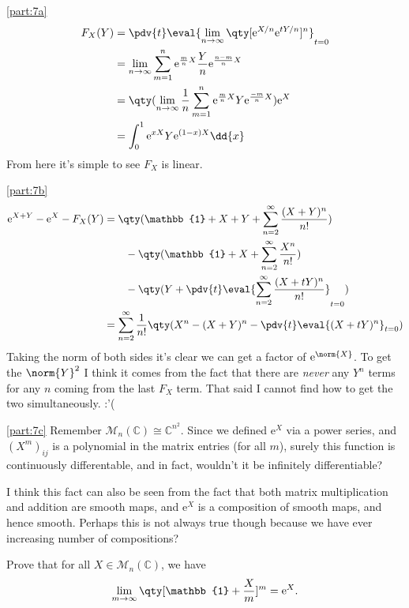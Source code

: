\documentclass[pages,boxes,color=WildStrawberry]{homework}
\newcommand{\C}{\mathbb{C}}
\newcommand{\1}{\mathbb{1}}
\newcommand{\e}{\mathrm{e}}
\newcommand{\mats}[2]{\mathcal{M}_{#1}(#2)}
\begin{document}
\begin{solution}
	\ref{part:7a}
	\begin{align*}
		F_X(Y) & = \pdv{t}\eval{\lim_{n\to\infty}\qty[\e^{X/n}\e^{tY/n}]^n}_{t=0}                                 \\
		       & = \lim_{n\to\infty}\sum_{m = 1}^{n}\e^{\frac{m}{n}X}\frac{Y}{n}\e^{\frac{n - m}{n}X}             \\
		       & = \qty(\lim_{n\to\infty}\frac{1}{n}\sum_{m = 1}^{n}\e^{\frac{m}{n}X} Y \e^{\frac{-m}{n}X})\e^{X} \\
		       & = \int_0^1\e^{xX}Y\e^{(1-x)X}\dd{x}
	\end{align*}
	From here it's simple to see $F_X$ is linear.

	\ref{part:7b}
	\begin{align*}
		\e^{X + Y} - \e^{X} - F_X(Y) & = \qty(\mathbb{1} + X + Y + \sum_{n = 2}^\infty\frac{(X+Y)^n}{n!})                  \\
		                             & \qquad - \qty(\mathbb{1} + X + \sum_{n = 2}^\infty\frac{X^n}{n!})                   \\
		                             & \qquad - \qty(Y + \pdv{t}\eval{\sum_{n = 2}^\infty\frac{(X + tY)^n}{n!}}_{t=0})     \\
		                             & = \sum_{n=2}^\infty\frac{1}{n!}\qty(X^n - (X+Y)^n - \pdv{t}\eval{(X + tY)^n}_{t=0})
	\end{align*}
	Taking the norm of both sides it's clear we can get a factor of $\e^{\norm{X}}$. To get the $\norm{Y}^2$ I think it comes from the fact that there are \emph{never} any $Y^n$ terms for any $n$ coming from the last $F_X$ term. That said I cannot find how to get the two simultaneously. :'(

	\ref{part:7c}
	Remember $\mats{n}{\C}\cong \C^{n^2}$. Since we defined $\e^{X}$ via a power series, and $(X^m)_{ij}$ is a polynomial in the matrix entries (for all $m$), surely this function is continuously differentable, and in fact, wouldn't it be infinitely differentiable?

	I think this fact can also be seen from the fact that both matrix multiplication and addition are smooth maps, and $\e^{X}$ is a composition of smooth maps, and hence smooth. Perhaps this is not always true though because we have ever increasing number of compositions?
\end{solution}

\begin{problem}
Prove that for all $X\in\mats{n}{\C}$, we have \[\lim_{m\to\infty}\qty[\1 + \frac{X}{m}]^m = \e^X.\]
\end{problem}
\end{document}
